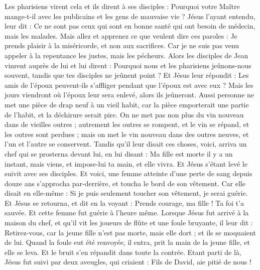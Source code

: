 \begin{multicols}{2}
Les pharisiens virent cela et ils dirent à ses disciples : Pourquoi votre Maître mange-t-il avec les publicains et les gens de mauvaise vie ?
Jésus l'ayant entendu, leur dit : Ce ne sont pas ceux qui sont en bonne santé qui ont besoin de médecin, mais les malades.
Mais allez et apprenez ce que veulent dire ces paroles : Je prends plaisir à la miséricorde, et non aux sacrifices{}. Car je ne suis pas venu appeler à la repentance les justes, mais les pécheurs.
Alors les disciples de Jean vinrent auprès de lui et lui dirent : Pourquoi nous et les pharisiens jeûnons-nous souvent, tandis que tes disciples ne jeûnent point ?
Et Jésus leur répondit : Les amis de l’époux peuvent-ils s'affliger pendant que l’époux est avec eux ? Mais les jours viendront où l’époux leur sera enlevé, alors ils jeûneront.
Aussi personne ne met une pièce de drap neuf à un vieil habit, car la pièce emporterait une partie de l’habit, et la déchirure serait pire.
On ne met pas non plus du vin nouveau dans de vieilles outres ; autrement les outres se rompent, et le vin se répand, et les outres sont perdues ; mais on met le vin nouveau dans des outres neuves, et l'un et l'autre se conservent.
Tandis qu’il leur disait ces choses, voici, arriva un chef qui se prosterna devant lui, en lui disant : Ma fille est morte il y a un instant, mais viens, et impose-lui ta main, et elle vivra.
Et Jésus s'étant levé le suivit avec ses disciples.
Et voici, une femme atteinte d'une perte de sang depuis douze ans s’approcha par-derrière, et toucha le bord de son vêtement.
Car elle disait en elle-même : Si je puis seulement toucher son vêtement, je serai guérie.
Et Jésus se retourna, et dit en la voyant : Prends courage, ma fille ! Ta foi t'a sauvée. Et cette femme fut guérie à l’heure même.
Lorsque Jésus fut arrivé à la maison du chef, et qu'il vit les joueurs de flûte et une foule bruyante,
il leur dit : Retirez-vous, car la jeune fille n'est pas morte, mais elle dort ; et ils se moquaient de lui.
Quand la foule eut été renvoyée, il entra, prit la main de la jeune fille, et elle se leva.
Et le bruit s'en répandit dans toute la contrée.
Etant parti de là, Jésus fut suivi par deux aveugles, qui criaient : Fils de David, aie pitié de nous !

\end{multicols}
